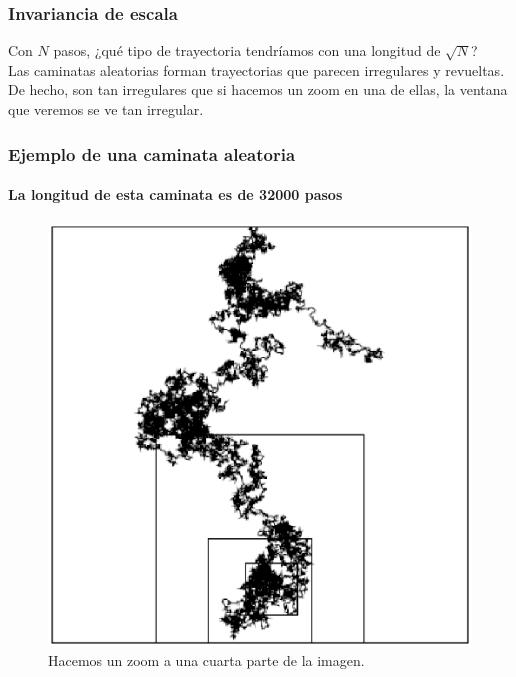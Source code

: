 \documentclass[12pt]{beamer}
\begin{document}
\begin{frame}
\frametitle{Invariancia de escala}
Con $N$ pasos, ¿qué tipo de trayectoria tendríamos con una longitud de $\sqrt{N}$?
\\
\bigskip
\pause
Las caminatas aleatorias forman trayectorias que parecen irregulares y revueltas. 
\\
\bigskip
\pause
De hecho, son tan irregulares que si hacemos un zoom en una de ellas, la ventana que veremos se ve tan irregular.
\end{frame}
\begin{frame}[plain]
\frametitle{Ejemplo de una caminata aleatoria}
\framesubtitle{La longitud de esta caminata es de 32000 pasos}
\begin{figure}
	\centering
	\includegraphics[scale=0.45]{Imagenes/caminataAleatoria_01.eps}
	\caption{Hacemos un zoom a una cuarta parte de la imagen.}
\end{figure}
\end{frame}
\end{document}
